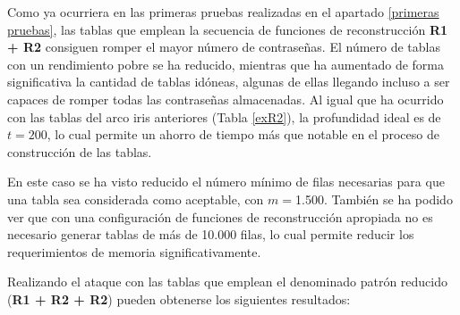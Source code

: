 \documentclass[12pt,spanish,listoffigures,listoftables,listofalgorithms]{tfgetsinf}
\begin{document}
Como ya ocurriera en las primeras pruebas realizadas en el apartado \ref{primeras pruebas}, las tablas que emplean la secuencia de funciones de reconstrucción \textbf{R1 + R2} consiguen romper el mayor número de contraseñas. El número de tablas con un rendimiento pobre se ha reducido, mientras que ha aumentado de forma significativa la cantidad de tablas idóneas, algunas de ellas llegando incluso a ser capaces de romper todas las contraseñas almacenadas. Al igual que ha ocurrido con las tablas del arco iris anteriores (Tabla \ref{exR2}), la profundidad ideal es de $t = 200$, lo cual permite un ahorro de tiempo más que notable en el proceso de construcción de las tablas.

En este caso se ha visto reducido el número mínimo de filas necesarias para que una tabla sea considerada como aceptable, con $m = $1.500. También se ha podido ver que con una configuración de funciones de reconstrucción apropiada no es necesario generar tablas de más de 10.000 filas, lo cual permite reducir los requerimientos de memoria significativamente.

Realizando el ataque con las tablas que emplean el denominado patrón reducido (\textbf{R1 + R2 + R2}) pueden obtenerse los siguientes resultados:
\end{document}
